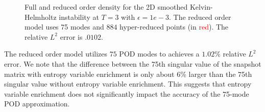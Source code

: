 \documentclass[preprint,10pt]{elsarticle}
\theoremstyle{definition}
\theoremstyle{lemma}
\theoremstyle{theorem}
\theoremstyle{assumption}
\newcommand{\note}[1]{{\color{blue}{#1}}}
\begin{document}
\begin{figure}
\centering
{}
\hspace{.175em}
\hspace{.1em}
\caption{Full and reduced order density for the 2D smoothed Kelvin-Helmholtz instability at $T = 3$ with $\epsilon = 1e-3$.  The reduced order model uses 75 modes and $884$ hyper-reduced points (in \textcolor{red}{red}).  The relative $L^2$ error is $.0102$.}
\label{fig:khrom}
\end{figure}
The reduced order model utilizes $75$ POD modes to achieves a $1.02\%$ relative $L^2$ error.  We note that the difference between the 75th singular value of the snapshot matrix with entropy variable enrichment is only about $6\%$ larger than the 75th singular value without entropy variable enrichment.  This suggests that entropy variable enrichment does not significantly impact the accuracy of the 75-mode POD approximation.  
\end{document}
